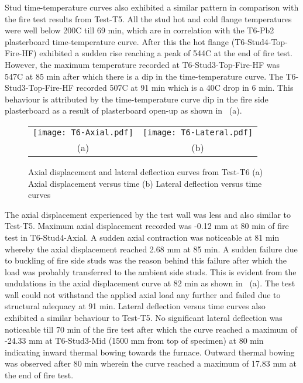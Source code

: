 Stud time-temperature curves also exhibited a similar pattern in comparison with the fire test results from Test-T5. All the stud hot and cold flange temperatures were well below 200\degree C till 69 min, which are in correlation with the T6-Pb2 plasterboard time-temperature curve. After this the hot flange (T6-Stud4-Top-Fire-HF) exhibited a sudden rise reaching a peak of 544\degree C at the end of fire test. However, the maximum temperature recorded at T6-Stud3-Top-Fire-HF was 547\degree C at 85 min after which there is a dip in the time-temperature curve. The T6-Stud3-Top-Fire-HF recorded 507\degree C at 91 min which is a 40\degree C drop in 6 min. This behaviour is attributed by the time-temperature curve dip in the fire side plasterboard as a result of plasterboard open-up as shown in ~(a). 
\begin{figure}[!htbp]
	\centering	
		\begin{tabular}{cc}
			\texttt{[image: T6-Axial.pdf]} & \texttt{[image: T6-Lateral.pdf]} \\
			(a) & (b) \\
			\end{tabular}
		\caption{Axial displacement and lateral deflection curves from Test-T6 (a) Axial displacement versus time (b) Lateral deflection versus time curves}
		\label{fig:T6-displacement}
\end{figure}

The axial displacement experienced by the test wall was less and also similar to Test-T5. Maximum axial displacement recorded was -0.12 mm at 80 min of fire test in T6-Stud4-Axial. A sudden axial contraction was noticeable at 81 min whereby the axial displacement reached 2.68 mm at 85 min. A sudden failure due to buckling of fire side studs was the reason behind this failure after which the load was probably transferred to the ambient side studs. This is evident from the undulations in the axial displacement curve at 82 min as shown in ~(a). The test wall could not withstand the applied axial load any further and failed due to structural adequacy at 91 min. Lateral deflection versus time curves also exhibited a similar behaviour to Test-T5. No significant lateral deflection was noticeable till 70 min of the fire test after which the curve reached a maximum of -24.33 mm at T6-Stud3-Mid (1500 mm from top of specimen) at 80 min indicating inward thermal bowing towards the furnace. Outward thermal bowing was observed after 80 min wherein the curve reached a maximum of 17.83 mm at the end of fire test.


